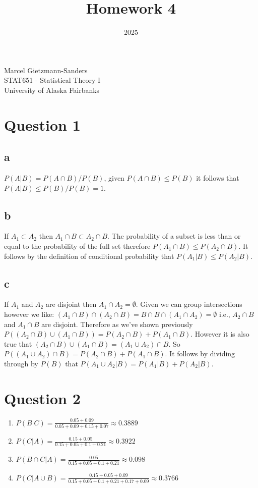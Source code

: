 \documentclass[11pt]{article}
\title{Homework 4}
\date{2025}
\makeatletter
\renewcommand{\maketitle}{
\begin{center}

\pagestyle{empty}

{\Large \bf \@title\par}
\vspace{1cm}

{\LARGE Marcel Gietzmann-Sanders}\\[1cm]

STAT651 - Statistical Theory I \\
University of Alaska Fairbanks


\end{center}
}\makeatother
\makeatother
\begin{document}
\maketitle

\section{Question 1}

\subsection{a}
$P(A|B)=P(A \cap B) / P(B)$, given $P(A \cap B) \leq P(B)$ it follows that $P(A|B) \leq P(B)/P(B) = 1$. 

\subsection{b}
If $A_1 \subset A_2$ then $A_1 \cap B \subset A_2 \cap B$. The probability of a subset is less than or equal to the probability of the full set therefore $P(A_1 \cap B) \leq P(A_2 \cap B)$. It follows by the definition of conditional probability that $P(A_1 | B) \leq P(A_2 |B)$.

\subsection{c}
If $A_1$ and $A_2$ are disjoint then $A_1 \cap A_2 = \emptyset$. Given we can group intersections however we like: $(A_1 \cap B) \cap (A_2 \cap B) = B \cap B \cap (A_1 \cap A_2) = \emptyset$ i.e., $A_2 \cap B$ and $A_1 \cap B$ are disjoint. Therefore as we've shown previously $P((A_2 \cap B) \cup (A_1 \cap B))= P(A_2 \cap B) + P(A_1 \cap B)$. However it is also true that $(A_2 \cap B) \cup (A_1 \cap B) = (A_1 \cup A_2) \cap B$. So $P((A_1 \cup A_2) \cap B) = P(A_2 \cap B) + P(A_1 \cap B)$. It follows by dividing through by $P(B)$ that $P(A_1 \cup A_2 | B) = P(A_1 | B) + P(A_2 | B)$. 

\section{Question 2}

\begin{enumerate}[label=\alph*]
\item $P(B|C) = \frac{0.05+0.09}{0.05+0.09+0.15+0.07}\approx 0.3889$
\item $P(C|A) = \frac{0.15+0.05}{0.15+0.05+0.1+0.21}\approx 0.3922$
\item $P(B \cap C | A)=\frac{0.05}{0.15+0.05+0.1+0.21}\approx 0.098$
\item $P(C|A\cup B) = \frac{0.15+0.05+0.09}{0.15+0.05+0.1+0.21+0.17+0.09} \approx 0.3766$
\end{enumerate}
\end{document}
